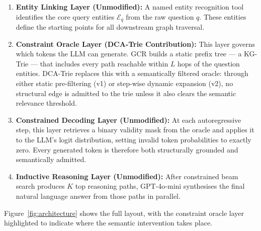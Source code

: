 \begin{enumerate}
  \item \textbf{Entity Linking Layer (Unmodified):} A named entity recognition tool identifies the core query entities $\mathcal{E}_q$ from the raw question $q$. These entities define the starting points for all downstream graph traversal.

  \item \textbf{Constraint Oracle Layer (DCA-Trie Contribution):} This layer governs which tokens the LLM can generate. GCR builds a static prefix tree — a KG-Trie — that includes every path reachable within $L$ hops of the question entities. DCA-Trie replaces this with a semantically filtered oracle: through either static pre-filtering (v1) or step-wise dynamic expansion (v2), no structural edge is admitted to the trie unless it also clears the semantic relevance threshold.

  \item \textbf{Constrained Decoding Layer (Unmodified):} At each autoregressive step, this layer retrieves a binary validity mask from the oracle and applies it to the LLM's logit distribution, setting invalid token probabilities to exactly zero. Every generated token is therefore both structurally grounded and semantically admitted.

  \item \textbf{Inductive Reasoning Layer (Unmodified):} After constrained beam search produces $K$ top reasoning paths, GPT-4o-mini synthesises the final natural language answer from those paths in parallel.
\end{enumerate}

Figure~\ref{fig:architecture} shows the full layout, with the constraint oracle layer highlighted to indicate where the semantic intervention takes place.

